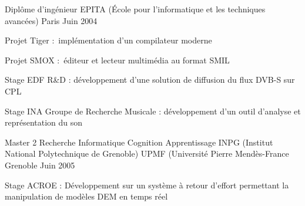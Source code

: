 

\begin{cventries}

  \cventry
    {Diplôme d'ingénieur} %
    {EPITA (École pour l'informatique et les techniques avancées)} %
    {Paris} %
    {Juin 2004} %
    {
      \begin{cvitems} %
        \item {Projet Tiger : implémentation d'un compilateur moderne}
        \item {Projet SMOX : éditeur et lecteur multimédia au format SMIL}
        \item {Stage EDF R\&D : développement d'une solution de diffusion du flux DVB-S sur CPL}
        \item {Stage INA Groupe de Recherche Musicale : développement d'un outil d’analyse et représentation du son}
      \end{cvitems}
    }

  \cventry
    {Master 2 Recherche Informatique Cognition Apprentissage} %
    {INPG (Institut National Polytechnique de Grenoble) \linebreak UPMF (Université Pierre Mendès-France} %
    {Grenoble} %
    {Juin 2005} %
    {
      \begin{cvitems} %
        \item {Stage ACROE : Développement sur un système à retour d'effort permettant la manipulation de modèles DEM en temps réel}
      \end{cvitems}
    }

\end{cventries}

